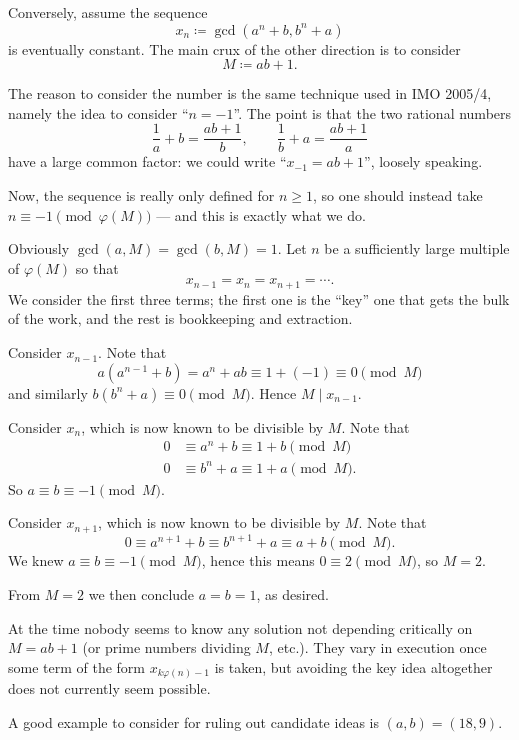 \documentclass[11pt]{scrartcl}
\begin{document}
Conversely, assume the sequence
\[ x_n \coloneqq \gcd(a^n+b, b^n+a) \] is eventually constant.
The main crux of the other direction is to consider
\[ M \coloneqq ab+1. \]
\begin{remark*}
  [Motivation]
  The reason to consider the number is the same technique used in IMO 2005/4,
  namely the idea to consider ``$n = -1$''.
  The point is that the two rational numbers
  \[ \frac 1a + b = \frac{ab+1}{b}, \qquad \frac 1b + a = \frac{ab+1}{a} \]
  have a large common factor: we could write ``$x_{-1} = ab + 1$'', loosely speaking.

  Now, the sequence is really only defined for $n \ge 1$,
  so one should instead take $n \equiv -1 \pmod{\varphi(M)}$
  --- and this is exactly what we do.
\end{remark*}
Obviously $\gcd(a,M) = \gcd(b,M) = 1$.
Let $n$ be a sufficiently large multiple of $\varphi(M)$
so that \[ x_{n-1} = x_n = x_{n+1} = \dotsb. \]
We consider the first three terms;
the first one is the ``key'' one that gets the bulk of the work,
and the rest is bookkeeping and extraction.
\begin{itemize}
  \ii Consider $x_{n-1}$.
  Note that
  \[ a (a^{n-1} + b) = a^n + ab \equiv 1 + (-1) \equiv 0 \pmod M \]
  and similarly $b (b^n + a) \equiv 0 \pmod M$.
  Hence $M \mid x_{n-1}$.

  \ii Consider $x_n$, which is now known to be divisible by $M$. Note that
  \begin{align*}
    0 &\equiv a^n + b \equiv 1 + b \pmod M \\
    0 &\equiv b^n + a \equiv 1 + a \pmod M.
  \end{align*}
  So $a \equiv b \equiv -1 \pmod M$.

  \ii Consider $x_{n+1}$, which is now known to be divisible by $M$. Note that
  \[ 0 \equiv a^{n+1} + b \equiv b^{n+1} + a \equiv a + b \pmod M. \]
  We knew $a \equiv b \equiv -1 \pmod M$,
  hence this means $0 \equiv 2 \pmod M$, so $M = 2$.
\end{itemize}
From $M = 2$ we then conclude $a = b = 1$, as desired.

\begin{remark*}
  At the time nobody seems to know any solution not depending critically
  on $M = ab+1$ (or prime numbers dividing $M$, etc.).
  They vary in execution once some term of the form $x_{k\varphi(n)-1}$ is taken,
  but avoiding the key idea altogether does not currently seem possible.

  A good example to consider for ruling out candidate ideas is $(a,b) = (18,9)$.
\end{remark*}
\pagebreak
\end{document}
